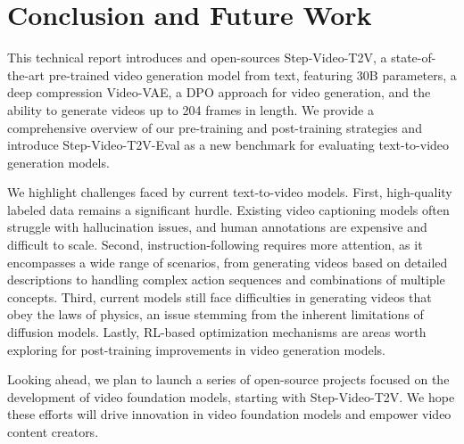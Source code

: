 \section{Conclusion and Future Work}


This technical report introduces and open-sources Step-Video-T2V, a state-of-the-art pre-trained video generation model from text, featuring 30B parameters, a deep compression Video-VAE, a DPO approach for video generation, and the ability to generate videos up to 204 frames in length. We provide a comprehensive overview of our pre-training and post-training strategies and introduce Step-Video-T2V-Eval as a new benchmark for evaluating text-to-video generation models.

We highlight challenges faced by current text-to-video models. First, high-quality labeled data remains a significant hurdle. Existing video captioning models often struggle with hallucination issues, and human annotations are expensive and difficult to scale. Second, instruction-following requires more attention, as it encompasses a wide range of scenarios, from generating videos based on detailed descriptions to handling complex action sequences and combinations of multiple concepts. Third, current models still face difficulties in generating videos that obey the laws of physics, an issue stemming from the inherent limitations of diffusion models. Lastly, RL-based optimization mechanisms are areas worth exploring for post-training improvements in video generation models.

Looking ahead, we plan to launch a series of open-source projects focused on the development of video foundation models, starting with Step-Video-T2V. We hope these efforts will drive innovation in video foundation models and empower video content creators.